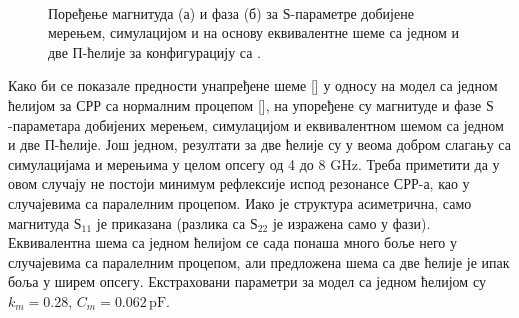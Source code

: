 \begin{figure}[!t]
\centering
{}\\
\caption{Поређење магнитуда (а) и фаза (б) за $Ѕ$-параметре добијене мерењем, симулацијом и на основу еквивалентне шеме са једном и две П-ћелије за конфигурацију са .}
\label{f14}
\end{figure}
Како би се показале предности унапређене шеме [] у односу на модел са једном ћелијом за СРР са нормалним процепом [], на  упоређене су магнитуде и фазе $Ѕ$-параметара добијених мерењем, симулацијом и еквивалентном шемом са једном и две П-ћелије. Још једном, резултати за две ћелије су у веома добром слагању са симулацијама и мерењима у целом опсегу од 4 до 8 GHz. Треба приметити да у овом случају не постоји минимум рефлексије испод резонансе СРР-а, као у случајевима са паралелним процепом. Иако је структура асиметрична, само магнитуда $Ѕ_{11}$ је приказана (разлика са $Ѕ_{22}$ је изражена само у фази). Еквивалентна шема са једном ћелијом се сада понаша много боље него у случајевима са паралелним процепом, али предложена шема са две ћелије је ипак боља у ширем опсегу. Екстраховани параметри за модел са једном ћелијом су $k_m=0.28$, $C_m=0.062\,\mathrm{pF}$.

